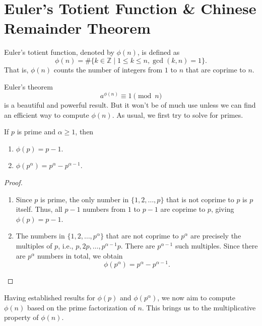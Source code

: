 \section{Euler's Totient Function \& Chinese Remainder Theorem}
\begin{definition}
    Euler's totient function, denoted by \( \phi(n) \), is defined as
    \[
    \phi(n) = \#\{ k \in \mathbb{Z} \mid 1 \leq k \leq n, \gcd(k, n) = 1 \}.
    \]
    That is, \( \phi(n) \) counts the number of integers from \( 1 \) to \( n \) that are coprime to \( n \).
    \end{definition}
Euler's theorem \[a^{\phi(n)} \equiv 1 \pmod{n}\] is a beautiful and powerful result. But it won't be of much use unless we can find an efficient way to compute $\phi(n)$. As usual, we first try to solve for primes.

\begin{prop}
    If $p$ is prime and $\alpha \ge 1$, then 
    \begin{enumerate}
        \item $\phi(p) = p-1$.
        \item $\phi(p^\alpha) = p^\alpha - p^{\alpha-1}.$
    \end{enumerate}
\end{prop}
\begin{proof}
    \begin{enumerate}
    \item Since \( p \) is prime, the only number in \( \{1, 2, \dots, p\} \) that is not coprime to \( p \) is \( p \) itself. Thus, all \( p-1 \) numbers from \( 1 \) to \( p-1 \) are coprime to \( p \), giving \( \phi(p) = p-1 \).

    \item The numbers in \( \{1, 2, \dots, p^\alpha\} \) that are not coprime to \( p^\alpha \) are precisely the multiples of \( p \), i.e., \( p, 2p, \dots, p^{\alpha-1} p \). There are \( p^{\alpha-1} \) such multiples. Since there are \( p^\alpha \) numbers in total, we obtain
    \[
    \phi(p^\alpha) = p^\alpha - p^{\alpha-1}.
    \]
    \end{enumerate}
\end{proof}

Having established results for $\phi(p)$ and $\phi(p^\alpha)$, we now aim to compute $\phi(n)$ based on the prime factorization of $n$. This brings us to the multiplicative property of $\phi(n)$.

